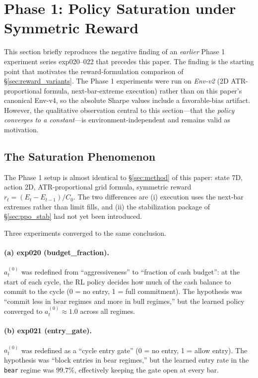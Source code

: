 \documentclass[11pt, a4paper]{article}
\begin{document}
\section{Phase 1: Policy Saturation under Symmetric Reward}
\label{sec:phase1_negative}

This section briefly reproduces the negative finding of an \emph{earlier} Phase
1 experiment series exp020--022 that precedes this paper. The
finding is the starting point that motivates the reward-formulation comparison
of \S\ref{sec:reward_variants}. The Phase 1 experiments were run on
\emph{Env-v2} (2D ATR-proportional formula, next-bar-extreme execution) rather
than on this paper's canonical Env-v4, so the absolute Sharpe values include
a favorable-bias artifact. However, the qualitative observation central
to this section---that the \emph{policy converges to a constant}---is
environment-independent and remains valid as motivation.

\subsection{The Saturation Phenomenon}
\label{sec:phase1_setting}

The Phase 1 setup is almost identical to \S\ref{sec:method} of this paper:
state 7D, action 2D, ATR-proportional grid formula, symmetric reward
$r_t = (E_t - E_{t-1})/C_0$. The two differences are (i) execution uses the
next-bar extremes rather than limit fills, and (ii) the stabilization package
of \S\ref{sec:ppo_stab} had not yet been introduced.

Three experiments converged to the same conclusion.

\paragraph{(a) exp020 (budget\_fraction).}
$a_t^{(0)}$ was redefined from ``aggressiveness'' to ``fraction of cash
budget'': at the start of each cycle, the RL policy decides how much of the
cash balance to commit to the cycle (0 = no entry, 1 = full commitment). The
hypothesis was ``commit less in bear regimes and more in bull regimes,'' but
the learned policy converged to $a_t^{(0)} \approx 1.0$ across all regimes.

\paragraph{(b) exp021 (entry\_gate).}
$a_t^{(0)}$ was redefined as a ``cycle entry gate'' (0 = no entry, 1 = allow
entry). The hypothesis was ``block entries in bear regimes,'' but the learned
entry rate in the \texttt{bear} regime was $99.7\%$, effectively keeping the
gate open at every bar.
\end{document}
